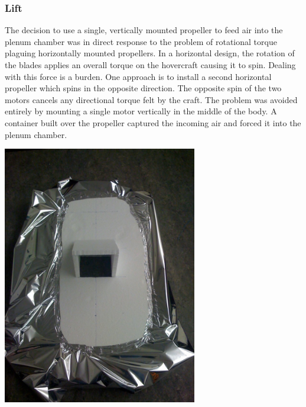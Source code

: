 \begin{minipage}{6.5in}
\begin{minipage}{6.5in}
\subsubsection{Lift}
The decision to use a single, vertically mounted propeller to feed air into the plenum chamber was in direct response to the problem of rotational torque plaguing horizontally mounted propellers. In a horizontal design, the rotation of the blades applies an overall torque on the hovercraft causing it to spin. Dealing with this force is a burden. One approach is to install a second horizontal propeller which spins in the opposite direction. The opposite spin of the two motors cancels any directional torque felt by the craft. The problem was avoided entirely by mounting a single motor vertically in the middle of the body. A container built over the propeller captured the incoming air and forced it into the plenum chamber.

\begin{minipage}{6.5in}
  \begin{center}
    \includegraphics[width=85mm]{imageSources/lift1.png}
  \end{center}
  \label{lif1}
\end{minipage}


\end{minipage}
\end{minipage}

